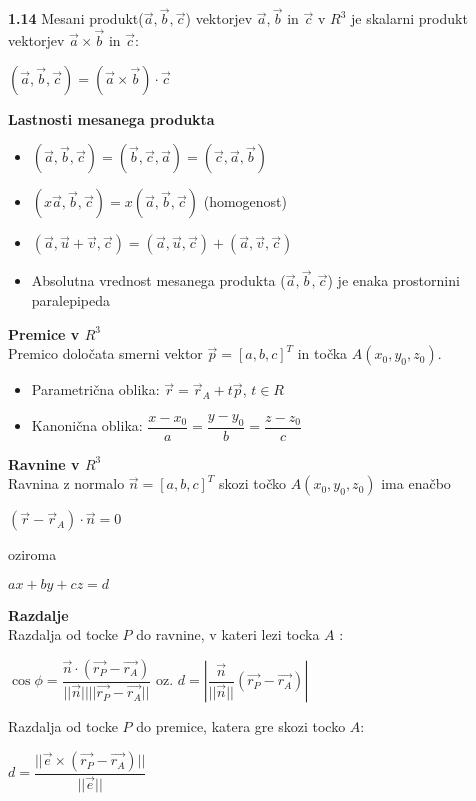 \documentclass{article}
\begin{document}
\begin{multicols}{2}
	\textbf{1.14} Mesani produkt($\vec{a}, \vec{b}, \vec{c}$) vektorjev
	$\vec{a}, \vec{b}$ in $\vec{c}$ v $R^{3}$ je skalarni produkt vektorjev
	$\vec{a} \times \vec{b}$ in $\vec{c}$:
	\begin{center}
		$(\vec{a}, \vec{b}, \vec{c}) = (\vec{a} \times \vec{b})\cdot \vec{c}$
	\end{center}

	\textbf{Lastnosti mesanega produkta}
	\begin{itemize}
		\item $(\vec{a}, \vec{b}, \vec{c}) = (\vec{b}, \vec{c}, \vec{a}) = (\vec{c}, \vec{a}, \vec{b})$
		\item $(x\vec{a}, \vec{b}, \vec{c}) = x(\vec{a}, \vec{b}, \vec{c})$ (homogenost)
		\item $(\vec{a}, \vec{u} + \vec{v}, \vec{c}) = (\vec{a}, \vec{u}, \vec{c}) + (\vec{a}, \vec{v}, \vec{c})$
		\item Absolutna vrednost mesanega produkta ($\vec{a}, \vec{b}, \vec{c}$) je enaka prostornini paralepipeda
	\end{itemize}

	\textbf{Premice v $R^{3}$} \\
	Premico določata smerni vektor $\vec{p} = [a, b, c]^{T}$ in točka $A(x_0, y_0, z_0)$.
	\begin{itemize}
		\item Parametrična oblika:
		      $\vec{r} = \vec{r}_{A} + t\vec{p}$, $t \in R$
		\item Kanonična oblika:
		      $\dfrac{x - x_{0}}{a} = \dfrac{y - y_{0}}{b} = \dfrac{z - z_{0}}{c}$
	\end{itemize}

	\textbf{Ravnine v $R^{3}$} \\
	Ravnina z normalo $\vec{n} = [a, b, c]^T$ skozi točko $A(x_0, y_0, z_0)$ ima enačbo
	\begin{center}
		$(\vec{r} - \vec{r}_A) \cdot \vec{n} = 0$
	\end{center}
	oziroma
	\begin{center}
		$ax + by + cz = d$
	\end{center}

	\textbf{Razdalje}\\
	Razdalja od tocke $P$ do ravnine, v kateri lezi tocka $A$ :
	\begin{center}
		$\cos\phi = \dfrac{\vec{n} \cdot ( \vec{r_{P}} - \vec{r_{A}})} {||\vec{n}|| ||\vec{r_{P}} - \vec{r_{A}}||}$ oz.
		$d = |\dfrac{\vec{n}}{||\vec{n}||} ( \vec{r_{P}} - \vec{r_{A}})|$
	\end{center}
	Razdalja od tocke $P$ do premice, katera gre skozi tocko $A$:
	\begin{center}
		$d = \dfrac{||\vec{e} \times ( \vec{r_{P}} - \vec{r_{A}})||}{||\vec{e}||}$
	\end{center}


\end{multicols}
\end{document}
